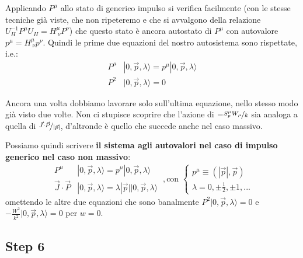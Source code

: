 \documentclass[../main.tex]{subfiles}
\begin{document}
Applicando $P^\mu$ allo stato di generico impulso si verifica facilmente (con le stesse tecniche già viste, che non ripeteremo e che si avvalgono della relazione \(U_H^{-1} P^\mu U_H = H^\mu_{~\nu}P^\nu\)) che questo stato è ancora autostato di $P^\mu$ con autovalore $p^\mu=H^\mu_{~\nu}p^\nu$.
Quindi le prime due equazioni del nostro autosistema sono rispettate, i.e.:
\[
\begin{aligned}
    P^\mu&|0, \Vec{p}, \lambda\rangle = p^\mu|0, \Vec{p}, \lambda\rangle \\
    P^2&|0, \Vec{p}, \lambda\rangle = 0
\end{aligned}
\]

Ancora una volta dobbiamo lavorare solo sull'ultima equazione, nello stesso modo già visto due volte. Non ci stupisce scoprire che l'azione di \(-\nicefrac{S_p^\mu W_\mu}{k}\) sia analoga a quella di \(\nicefrac{\Vec{J}\cdot\Vec{P}}{|\Vec{p}|}\), d'altronde è quello che succede anche nel caso massivo. 

Possiamo quindi scrivere \textbf{il sistema agli autovalori nel caso di impulso generico nel caso non massivo}:
\[
\boxed{
\begin{aligned}
    P^\mu&|0, \Vec{p}, \lambda\rangle = p^\mu|0, \Vec{p}, \lambda\rangle\\
    \Vec{J}\cdot\Vec{P}&|0, \Vec{p}, \lambda\rangle = \lambda |\Vec{p}| |0, \Vec{p}, \lambda\rangle
\end{aligned}
}~,\text{con } 
\begin{cases}
    p^\mu \equiv (|\Vec{p}|, \Vec{p})\\
    \lambda = 0, \pm \frac{1}{2}, \pm1, ...
\end{cases}
\]
omettendo le altre due equazioni che sono banalmente \(P^2|0, \Vec{p}, \lambda\rangle =0\) e \(-\frac{W^2}{k^2}|0, \Vec{p}, \lambda\rangle =0\) per $w=0$.
\subsection{Step 6}
\end{document}
